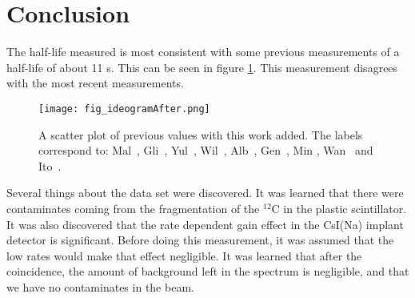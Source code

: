 \documentclass[MaxHughesThesis.tex]{subfiles}
\begin{document}
\section{Conclusion}
\label{sec:conclusion}

The half-life measured is most consistent with some previous measurements of a half-life of about 11 s. 
This can be seen in figure \ref{fig:ideogramfinal}.
This measurement disagrees with the most recent measurements.

\begin{figure}[!htb]
\centerline{\texttt{[image: fig\_ideogramAfter.png]}}
\caption{A scatter plot of previous values with this work added.
	 The labels correspond to: Mal~\cite{Mal62}, Gli~\cite{Gli63},
	Yul~\cite{Yul67}, Wil~\cite{Wil70}, Alb~\cite{Alb75}, Gen~\cite{Gen76},
	Min \cite{Min87}, Wan~\cite{Wan92} and Ito~\cite{Ito95}.}
\label{fig:ideogramfinal}
\end{figure}

Several things about the data set were discovered.
It was learned that there were contaminates coming from the fragmentation of the $^{12}$C in the plastic scintillator.
It was also discovered that the rate dependent gain effect in the CsI(Na) implant detector is significant.
Before doing this measurement, it was assumed that the low rates would make that effect negligible.
It was learned that after the coincidence, the amount of background left in the spectrum is negligible, and that we have no contaminates in the beam.
\end{document}

